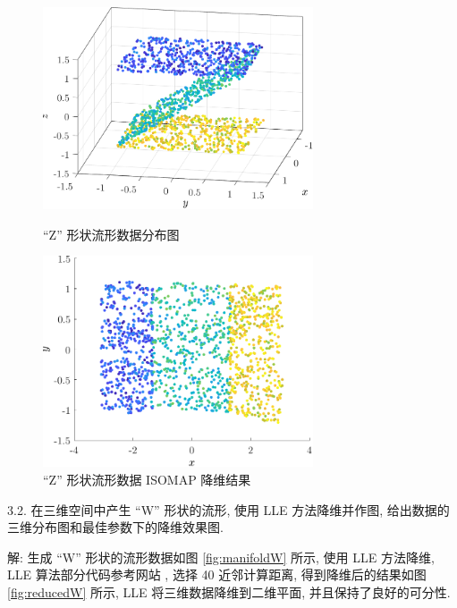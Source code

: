 \documentclass{article}
\begin{document}
\begin{figure}[htbp]
  \centering
  \begin{minipage}[t]{0.48\textwidth}
    \centering
    \includegraphics[width=8cm]{manifoldZ.pdf}
    \caption{``Z'' 形状流形数据分布图}
    \label{fig:manifoldZ}
  \end{minipage}
  \begin{minipage}[t]{0.48\textwidth}
    \centering
    \includegraphics[width=8cm]{reducedZ.pdf}
    \caption{``Z'' 形状流形数据 ISOMAP 降维结果}
    \label{fig:reducedZ}
  \end{minipage}
\end{figure}

3.2. 在三维空间中产生 ``W'' 形状的流形, 使用 LLE 方法降维并作图, 给出数据的三维分布图和最佳参数下的降维效果图.

解: 生成 ``W'' 形状的流形数据如图 \ref{fig:manifoldW} 所示, 使用 LLE 方法降维, LLE 算法部分代码参考网站 \cite{lle}, 选择 40 近邻计算距离, 得到降维后的结果如图 \ref{fig:reducedW} 所示, LLE 将三维数据降维到二维平面, 并且保持了良好的可分性.
\end{document}
